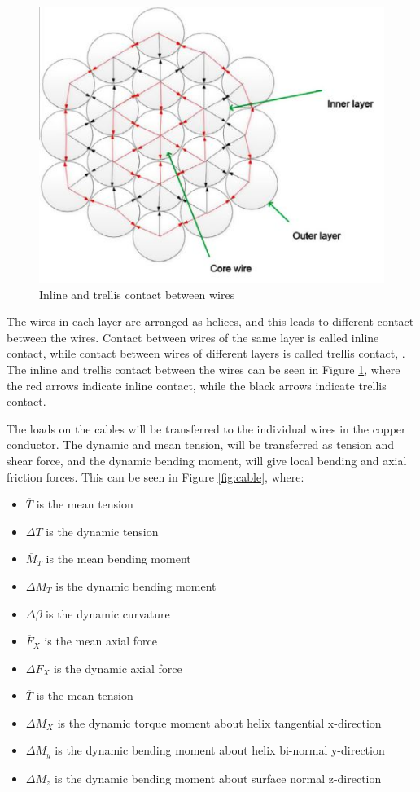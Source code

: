   \begin{figure}[H]
\centering
\includegraphics[scale=0.9]{figures/cross}
\caption[$\; \:$Inline and trellis contact between wires]{Inline and trellis contact between wires \cite{Nasution2013} }
 \label{fig:cross}
\end{figure}
  
 \noindent The wires in each layer are arranged as helices, and this leads to different contact between the wires. Contact between wires of the same layer is called inline contact, while contact between wires of different layers is called trellis contact, \cite{Nasution2013}. The inline and trellis contact between the wires can be seen in Figure \ref{fig:cross}, where the red arrows indicate inline contact, while the black arrows indicate trellis contact. 

\noindent The loads on the cables will be transferred to the individual wires in the copper conductor. The dynamic and mean tension, will be transferred as tension and shear force, and the dynamic bending moment, will give local bending and axial friction forces. This can be seen in Figure \ref{fig:cable}, where:
\begin{itemize}
    \item $\overline T$ is the mean tension
    \item $\Delta T$ is the dynamic tension
    \item $\overline M_T$ is the mean bending moment
    \item $\Delta M_T$ is the dynamic bending moment
    \item $\Delta \beta$ is the dynamic curvature
    \item $\overline F_X$ is the mean axial force
    \item $\Delta F_X$ is the dynamic axial force
    \item $\overline T$ is the mean tension
    \item $\Delta M_X$ is the dynamic torque moment about helix tangential x-direction
    \item $\Delta M_y$ is the dynamic bending moment about helix bi-normal y-direction
    \item $\Delta M_z$ is the dynamic bending moment about surface normal z-direction
\end{itemize}


